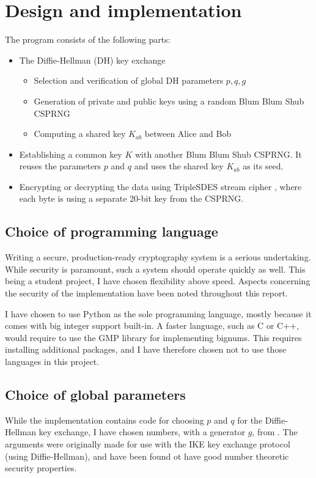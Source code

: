 \documentclass[a4paper,english,12pt]{article}
\begin{document}
\section{Design and implementation}
The program consists of the following parts:
\begin{itemize}
  \item The Diffie-Hellman \cite{dh} (DH) key exchange
    \begin{itemize}
      \item Selection and verification of global DH parameters $p, q, g$
      \item Generation of private and public keys using a random Blum Blum Shub CSPRNG
      \item Computing a shared key $K_{ab}$ between Alice and Bob
    \end{itemize}
  \item Establishing a common key $K$ with another Blum Blum Shub CSPRNG. It
    reuses the parameters $p$ and $q$ and uses the shared key $K_{ab}$ as its
    seed.
  \item Encrypting or decrypting the data using TripleSDES stream cipher
    \cite{sdes}, where each byte is using a separate 20-bit key from the
    CSPRNG.
\end{itemize}

\subsection{Choice of programming language}
Writing a secure, production-ready cryptography system is a serious
undertaking. While security is paramount, such a system should operate quickly
as well. This being a student project, I have chosen flexibility above
speed. Aspects concerning the security of the implementation have been noted
throughout this report.

I have chosen to use Python as the sole programming language, mostly because it
comes with big integer support built-in. A faster language, such as C or C++,
would require to use the GMP library \cite{wiki:gmp} for implementing bignums.
This requires installing additional packages, and I have therefore chosen not
to use those languages in this project.

\subsection{Choice of global parameters}
While the implementation contains code for choosing $p$ and $q$ for the
Diffie-Hellman key exchange, I have chosen numbers, with a generator $g$, from
\cite{rfc3526}. The arguments were originally made for use with the IKE key
exchange protocol (using Diffie-Hellman), and have been found ot have good
number theoretic security properties.
\end{document}
